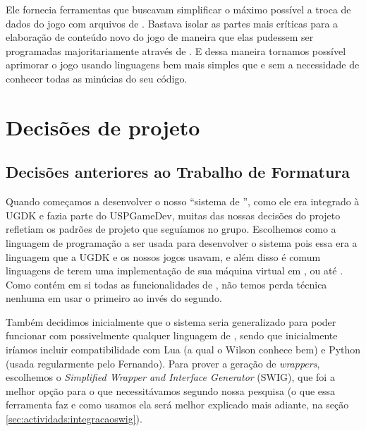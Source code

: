     Ele fornecia ferramentas que buscavam simplificar o máximo possível a
    troca de dados do jogo com arquivos de \script{}. Bastava isolar as
    partes mais críticas para a elaboração de conteúdo novo do jogo de maneira
    que elas pudessem ser programadas majoritariamente através de . E
    dessa maneira tornamos possível aprimorar o jogo usando linguagens bem mais
    simples que \CXX{} e sem a necessidade de conhecer todas as minúcias do seu
    código.


  \section{Decisões de projeto}
  \label{sec:actividads:decisoes}

  \subsection{Decisões anteriores ao Trabalho de Formatura}
  Quando começamos a desenvolver o nosso ``sistema de '',
  como ele era integrado à UGDK e fazia parte do USPGameDev, muitas das
  nossas decisões do projeto refletiam os padrões de projeto que seguíamos
  no grupo. Escolhemos \CXX{} como a linguagem de programação a ser usada
  para desenvolver o sistema pois essa era a linguagem que a UGDK e os nossos
  jogos usavam, e além disso é comum linguagens de \script{} terem uma
  implementação de sua máquina virtual em \C{}, ou até \CXX{}. Como \CXX{}
  contém em si todas as funcionalidades de \C{}, não temos perda técnica nenhuma
  em usar o primeiro ao invés do segundo.
  
  Também decidimos inicialmente que o sistema seria generalizado para poder
  funcionar com possivelmente qualquer linguagem de \script{}, sendo que
  inicialmente iríamos incluir compatibilidade com Lua (a qual o Wilson conhece
  bem) e Python (usada regularmente pelo Fernando). Para prover a geração de 
  \textit{wrappers}, escolhemos o \emph{Simplified Wrapper and Interface Generator} 
  (SWIG\cite{swig:00}), que foi a melhor opção para o que 
  necessitávamos segundo nossa pesquisa (o que essa ferramenta faz e como
  usamos ela será melhor explicado mais adiante, na seção \ref{sec:actividads:integracaoswig}).
  
